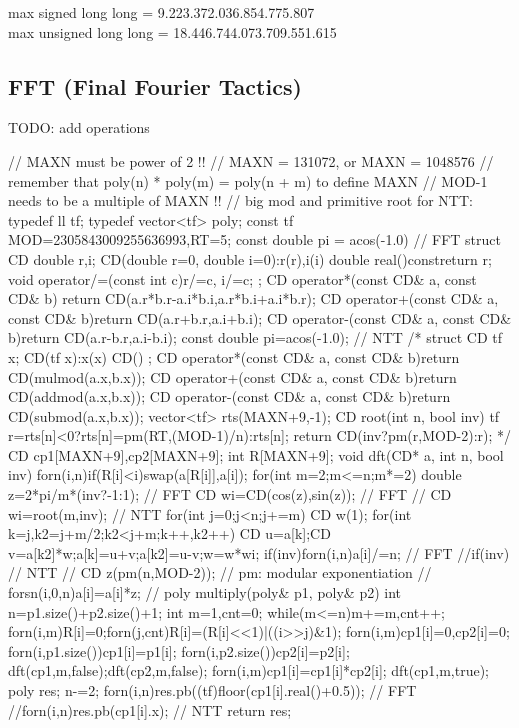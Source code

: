 \documentclass[10pt, landscape, twocolumn, a4paper, notitlepage]{article}
\begin{document}
max signed long long = 9.223.372.036.854.775.807 \\
max unsigned long long = 18.446.744.073.709.551.615
\subsection{FFT (Final Fourier Tactics)}
TODO: add operations
\begin{code}
// MAXN must be power of 2 !!
// MAXN = 131072, or MAXN = 1048576 
// remember that poly(n) * poly(m) = poly(n + m) to define MAXN
// MOD-1 needs to be a multiple of MAXN !!
// big mod and primitive root for NTT:
typedef ll tf;
typedef vector<tf> poly;
const tf MOD=2305843009255636993,RT=5;
const double pi = acos(-1.0)
// FFT
struct CD {
	double r,i;
	CD(double r=0, double i=0):r(r),i(i){}
	double real()const{return r;}
	void operator/=(const int c){r/=c, i/=c;}
};
CD operator*(const CD& a, const CD& b){
	return CD(a.r*b.r-a.i*b.i,a.r*b.i+a.i*b.r);}
CD operator+(const CD& a, const CD& b){return CD(a.r+b.r,a.i+b.i);}
CD operator-(const CD& a, const CD& b){return CD(a.r-b.r,a.i-b.i);}
const double pi=acos(-1.0);
// NTT
/*
struct CD {
	tf x;
	CD(tf x):x(x){}
	CD(){}
};
CD operator*(const CD& a, const CD& b){return CD(mulmod(a.x,b.x));}
CD operator+(const CD& a, const CD& b){return CD(addmod(a.x,b.x));}
CD operator-(const CD& a, const CD& b){return CD(submod(a.x,b.x));}
vector<tf> rts(MAXN+9,-1);
CD root(int n, bool inv){
	tf r=rts[n]<0?rts[n]=pm(RT,(MOD-1)/n):rts[n];
	return CD(inv?pm(r,MOD-2):r);
}
*/
CD cp1[MAXN+9],cp2[MAXN+9];
int R[MAXN+9];
void dft(CD* a, int n, bool inv){
	forn(i,n)if(R[i]<i)swap(a[R[i]],a[i]);
	for(int m=2;m<=n;m*=2){
		double z=2*pi/m*(inv?-1:1); // FFT
		CD wi=CD(cos(z),sin(z)); // FFT
		// CD wi=root(m,inv); // NTT
		for(int j=0;j<n;j+=m){
			CD w(1);
			for(int k=j,k2=j+m/2;k2<j+m;k++,k2++){
				CD u=a[k];CD v=a[k2]*w;a[k]=u+v;a[k2]=u-v;w=w*wi;
			}
		}
	}
	if(inv)forn(i,n)a[i]/=n; // FFT
	//if(inv){ // NTT
	//	CD z(pm(n,MOD-2)); // pm: modular exponentiation
	//	forsn(i,0,n)a[i]=a[i]*z;
	//}
}
poly multiply(poly& p1, poly& p2){
	int n=p1.size()+p2.size()+1;
	int m=1,cnt=0;
	while(m<=n)m+=m,cnt++;
	forn(i,m){R[i]=0;forn(j,cnt)R[i]=(R[i]<<1)|((i>>j)&1);}
	forn(i,m)cp1[i]=0,cp2[i]=0;
	forn(i,p1.size())cp1[i]=p1[i];
	forn(i,p2.size())cp2[i]=p2[i];
	dft(cp1,m,false);dft(cp2,m,false);
	forn(i,m)cp1[i]=cp1[i]*cp2[i];
	dft(cp1,m,true);
	poly res;
	n-=2;
	forn(i,n)res.pb((tf)floor(cp1[i].real()+0.5)); // FFT
	//forn(i,n)res.pb(cp1[i].x); // NTT
	return res;
}
\end{code}
\end{document}
